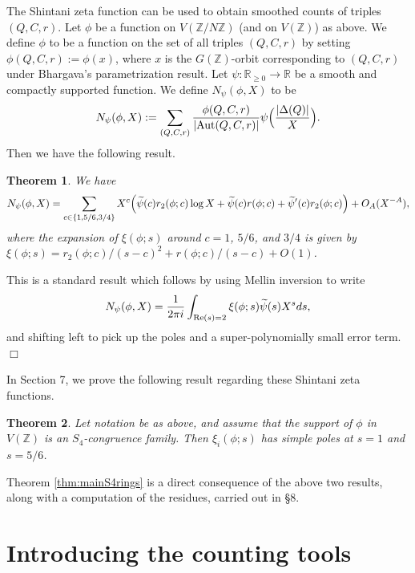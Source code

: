 \documentclass{article}
\def\Z{{\mathbb Z}}
\def\Aut{{\rm Aut}}
\def\Re{{\rm Re}}
\def\R{{\mathbb R}}
\def\Z{{\mathbb Z}}
\def\wt{\widetilde}
\newtheorem{theorem}{Theorem}[section]
\newenvironment{proof}{\noindent {\bf Proof:}}{$\Box$ \vspace{2 ex}}
\begin{document}
The Shintani zeta function can be used to obtain smoothed counts of triples $(Q,C,r)$. Let $\phi$ be a function on $V(\Z/N\Z)$ (and on $V(\Z)$) as above. We define $\phi$ to be a function on the set of all triples $(Q,C,r)$ by setting $\phi(Q,C,r):=\phi(x)$, where $x$ is the $G(\Z)$-orbit corresponding to $(Q,C,r)$ under Bhargava's parametrization result. Let $\psi:\R_{\geq 0}\to\R$ be a smooth and compactly supported function. We define $N_\psi(\phi,X)$ to be
\begin{equation*}
N_\psi(\phi,X):= \sum_{(Q,C,r)}\frac{\phi(Q,C,r)}{|\Aut(Q,C,r)|}\psi\Bigl(\frac{|\Delta(Q)|}{X}\Bigr).
\end{equation*}
Then we have the following result.
\begin{theorem}\label{th:countingbyzeta}
We have
\begin{equation}\label{eq:countingbyzeta}
N_\psi(\phi,X)=\sum_{c\in\{1,5/6,3/4\}}X^c\Bigl(\wt{\psi}(c)r_2(\phi;c)\log X+\wt{\psi}(c)r(\phi;c)+\wt{\psi}'(c)r_2(\phi;c)\Bigr)+O_A(X^{-A}),
\end{equation}
where the expansion of $\xi(\phi;s)$ around $c=1$, $5/6$, and $3/4$ is given by $\xi(\phi;s)=r_2(\phi;c)/(s-c)^2+r(\phi;c)/(s-c)+O(1)$.
\end{theorem}
\begin{proof}
This is a standard result which follows by using Mellin inversion to write
\begin{equation*}
N_\psi(\phi,X)=\frac{1}{2\pi i}\int_{\Re(s)=2}\xi(\phi;s)\wt{\psi}(s)X^s ds,
\end{equation*}
and shifting left to pick up the poles and a super-polynomially small error term.
\end{proof}

In Section 7, we prove the following result regarding these Shintani zeta functions.
\begin{theorem}\label{thm:Shintani_residues}
Let notation be as above, and assume that the support of $\phi$ in $V(\Z)$ is an $S_4$-congruence family. Then $\xi_i(\phi;s)$ has simple poles at $s=1$ and $s=5/6$.
\end{theorem}

Theorem \ref{thm:mainS4rings} is a direct consequence of the above two results, along with a computation of the residues, carried out in \S8.






\section{Introducing the counting tools}
\end{document}
